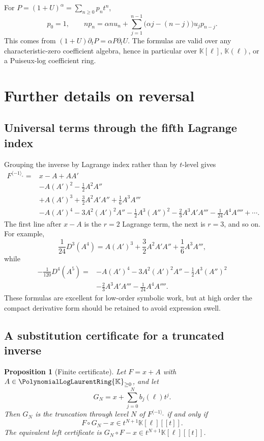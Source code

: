 \documentclass[11pt,oneside]{article}
\numberwithin{equation}{section}
\newtheorem{proposition}[theorem]{Proposition}
\theoremstyle{definition}
\newcommand{\K}{\mathbb{K}}
\newcommand{\PL}{\PolynomialLogLaurentRing{\K}}
\newcommand{\rev}{\langle-1\rangle_{\circ}}
\begin{document}
For \(P=(1+U)^\alpha=\sum_{n\ge0}p_nt^n\),
\begin{equation}\label{eq:power-coefficient-recurrence}
  p_0=1,
  \qquad
  np_n=\alpha n u_n+
   \sum_{j=1}^{n-1}\bigl(\alpha j-(n-j)\bigr)u_jp_{n-j}.
\end{equation}
This comes from \((1+U)\partial_tP=\alpha P\partial_tU\).  The formulas are
valid over any characteristic-zero coefficient algebra, hence in particular
over \(\K[\ell]\), \(\K(\ell)\), or a Puiseux-log coefficient ring.

\section{Further details on reversal}\label{app:reversal}

\subsection{Universal terms through the fifth Lagrange index}

Grouping the inverse by Lagrange index rather than by \(t\)-level gives
\begin{align}
 F^{\rev}={}&x-A
 +AA'\nonumber\\
 &-A(A')^2-\frac12A^2A''\nonumber\\
 &+A(A')^3+\frac32A^2A'A''+\frac16A^3A'''\nonumber\\
 &-A(A')^4-3A^2(A')^2A''-\frac12A^3(A'')^2
   -\frac23A^3A'A'''-\frac1{24}A^4A''''
 +\cdots.\label{eq:inverse-universal-through-five}
\end{align}
The first line after \(x-A\) is the \(r=2\) Lagrange term, the next is
\(r=3\), and so on.  For example,
\[
 \frac{1}{24}D^3(A^4)
 =A(A')^3+\frac32A^2A'A''+\frac16A^3A''',
\]
while
\begin{align*}
 -\frac1{120}D^4(A^5)={}&-A(A')^4-3A^2(A')^2A''
 -\frac12A^3(A'')^2\\
 &-\frac23A^3A'A'''-\frac1{24}A^4A''''.
\end{align*}
These formulas are excellent for low-order symbolic work, but at high order the
compact derivative form should be retained to avoid expression swell.

\subsection{A substitution certificate for a truncated inverse}

\begin{proposition}[Finite certificate]\label{prop:inverse-certificate}
Let \(F=x+A\) with \(A\in{\PL}_{\ge0}\), and let
\[
  G_N=x+\sum_{j=0}^{N}b_j(\ell)t^j.
\]
Then \(G_N\) is the truncation through level \(N\) of \(F^{\rev}\) if and only
if
\begin{equation}\label{eq:inverse-certificate}
  F\circ G_N-x\in t^{N+1}\K[\ell][[t]].
\end{equation}
The equivalent left certificate is
\(G_N\circ F-x\in t^{N+1}\K[\ell][[t]]\).
\end{proposition}
\end{document}
